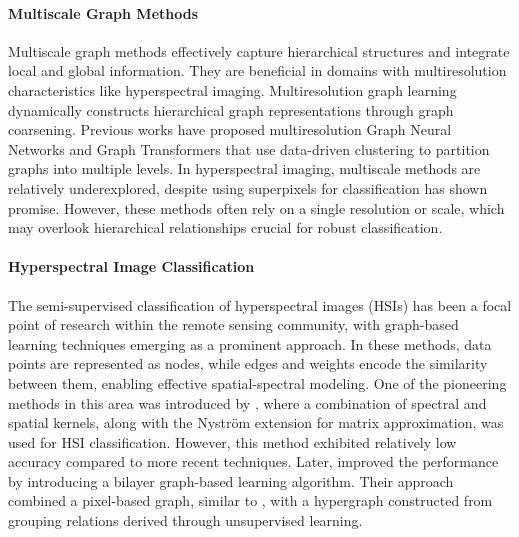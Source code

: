 \paragraph{Multiscale Graph Methods} Multiscale graph methods effectively capture hierarchical structures and integrate local and global information. They are beneficial in domains with multiresolution characteristics like hyperspectral imaging. Multiresolution graph learning dynamically constructs hierarchical graph representations through graph coarsening. Previous works have proposed multiresolution Graph Neural Networks \cite{Hy_2023, pmlr-v184-hy22a, 10.1063/5.0152833, trang2024scalable} and Graph Transformers that use data-driven clustering to partition graphs into multiple levels. In hyperspectral imaging, multiscale methods are relatively underexplored, despite using superpixels for classification has shown promise. However, these methods often rely on a single resolution or scale, which may overlook hierarchical relationships crucial for robust classification.

\paragraph{Hyperspectral Image Classification} %
The semi-supervised classification of hyperspectral images (HSIs) has been a focal point of research within the remote sensing community, with graph-based learning techniques emerging as a prominent approach. In these methods, data points are represented as nodes, while edges and weights encode the similarity between them, enabling effective spatial-spectral modeling.
One of the pioneering methods in this area was introduced by \citet{campsvalls2007}, where a combination of spectral and spatial kernels, along with the Nystr\"om extension for matrix approximation, was used for HSI classification. However, this method exhibited relatively low accuracy compared to more recent techniques. Later, \citet{gao2014} improved the performance by introducing a bilayer graph-based learning algorithm. Their approach combined a pixel-based graph, similar to \cite{campsvalls2007}, with a hypergraph constructed from grouping relations derived through unsupervised learning. 

